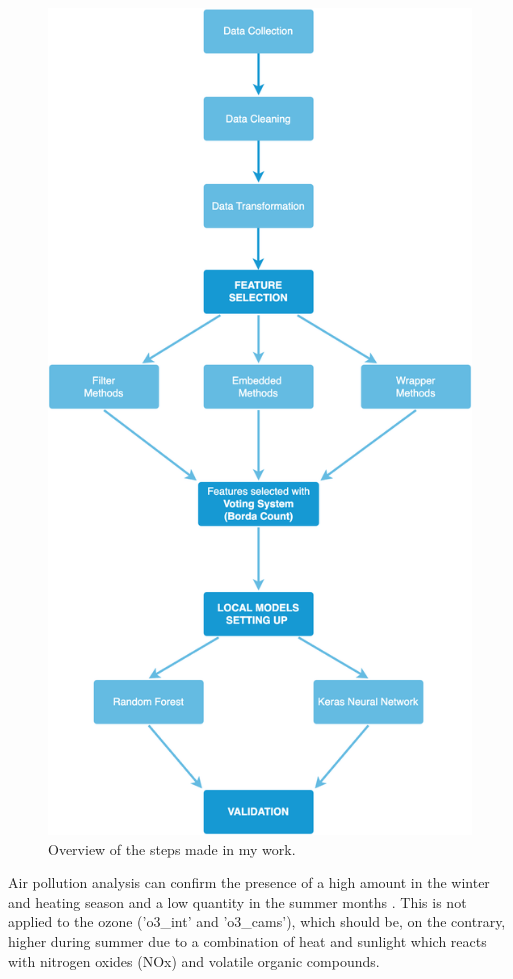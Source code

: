 \begin{figure}[H]
    \centering
    \includegraphics[scale=0.21]{images/overview.png}
    \caption{Overview of the steps made in my work.}
    \label{fig:graphstatspm2.5}
\end{figure}
Air pollution analysis can confirm the presence of a high amount in the winter and heating season and a low quantity in the summer months \cite{cichowicz2017dispersion}. This is not applied to the ozone ('o3\_int' and 'o3\_cams'), which should be, on the contrary, higher during summer due to a combination of heat and sunlight which reacts with nitrogen oxides (NOx) and volatile organic compounds.\\
